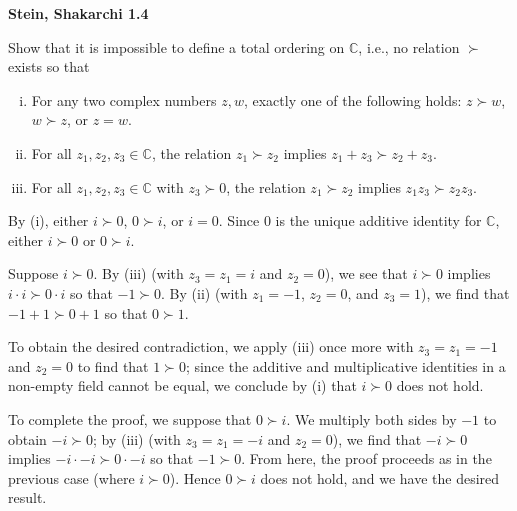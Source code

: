\textbf{Stein, Shakarchi 1.4}

Show that it is impossible to define a total ordering on $\mathbb{C}$, i.e., no relation $\succ$ exists so that

\begin{enumerate}[(i)]
    \item For any two complex numbers $z, w$, exactly one of the following holds: $z \succ w$, $w \succ z$, or $z = w$.

    \item For all $z_1, z_2, z_3 \in \mathbb{C}$, the relation $z_1 \succ z_2$ implies $z_1 + z_3 \succ z_2 + z_3$.
    
    \item For all $z_1, z_2, z_3 \in \mathbb{C}$ with $z_3 \succ 0$, the relation $z_1 \succ z_2$ implies $z_1 z_3 \succ z_2 z_3$.
\end{enumerate}


\begin{solution}
    By (i), either $i \succ 0$, $0 \succ i$, or $i = 0$. Since $0$ is the unique additive identity for $\mathbb{C}$, 
    either $i \succ 0$ or $0 \succ i$. 
    
    Suppose $i \succ 0$. By (iii) (with $z_3 = z_1 = i$ and $z_2 = 0$), we see that 
    $i \succ 0$ implies $i \cdot i \succ 0 \cdot i$ so that $-1 \succ 0$. By (ii) (with $z_1 = -1$, $z_2 = 0$, and 
    $z_3 = 1$), we find that $-1 + 1 \succ 0 + 1$ so that $0 \succ 1$.
    
    To obtain the desired contradiction, we apply (iii) once more with $z_3 = z_1 = -1$ and $z_2 = 0$ to find that 
    $1 \succ 0$; since the additive and multiplicative identities in a non-empty field cannot be equal, we conclude by 
    (i) that $i \succ 0$ does not hold.

    To complete the proof, we suppose that $0 \succ i$. We multiply both sides by $-1$ to obtain $-i \succ 0$; by (iii)
    (with $z_3 = z_1 = -i$ and $z_2 = 0$), we find that $-i \succ 0$ implies $-i \cdot -i \succ 0 \cdot -i$ so that 
    $-1 \succ 0$. From here, the proof proceeds as in the previous case (where $i \succ 0$). Hence $0 \succ i$ does not 
    hold, and we have the desired result.
    \ \\
\end{solution}
